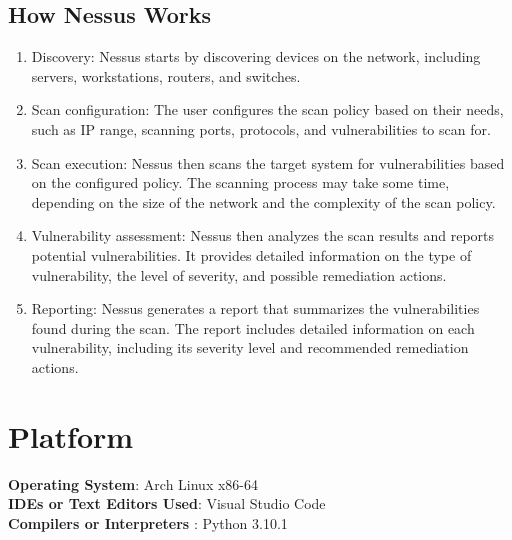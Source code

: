 \documentclass[openany]{book}
\begin{document}
\subsection{How Nessus Works}
\begin{enumerate}
    \item Discovery: Nessus starts by discovering devices on the network, including servers, workstations, routers, and switches.
    \item Scan configuration: The user configures the scan policy based on their needs, such as IP range, scanning ports, protocols, and vulnerabilities to scan for.
    \item Scan execution: Nessus then scans the target system for vulnerabilities based on the configured policy. The scanning process may take some time, depending on the size of the network and the complexity of the scan policy.
    \item Vulnerability assessment: Nessus then analyzes the scan results and reports potential vulnerabilities. It provides detailed information on the type of vulnerability, the level of severity, and possible remediation actions.
    \item Reporting: Nessus generates a report that summarizes the vulnerabilities found during the scan. The report includes detailed information on each vulnerability, including its severity level and recommended remediation actions.
\end{enumerate}

\section{Platform}
\textbf{\textbf{Operating System}}: Arch Linux x86-64 \\
\textbf{\textbf{IDEs or Text Editors Used}}: Visual Studio Code\\
\textbf{\textbf{Compilers or Interpreters} }: Python 3.10.1\\
\end{document}
